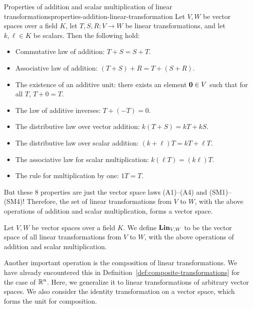 \begin{proposition}{Properties of addition and scalar multiplication of linear transformations}{properties-addition-linear-transformation}
  Let $V,W$ be vector spaces over a field $K$, let $T,S,R:V\to W$
  be linear transformations, and let $k,\ell\in K$ be scalars. Then
  the following hold:%
  \begin{itemize}\setlength\itemsep{0em}
  \item Commutative law of addition:
    $T+S = S+T$.
  \item Associative law of addition:
    $(T+S)+R = T+(S+R)$.
  \item The existence of an additive unit: there exists an element $\mbox{\bf 0}\in
    V$ such that for all $T$,
    $T + 0 = T$.
  \item The law of additive inverses:
    $T + (-T) = 0$.
  \item The distributive law over vector addition:
    $k(T + S) = kT + kS$.
  \item The distributive law over scalar addition:
    $(k + \ell) T = k T + \ell T$.
  \item The associative law for scalar multiplication:
    $k(\ell T) = (k \ell)T$.
  \item The rule for multiplication by one:
    $1T=T$.
  \end{itemize}
\end{proposition}

But these 8 properties are just the vector space laws (A1)--(A4) and
(SM1)--(SM4)! Therefore, the set of linear transformations from $V$ to
$W$, with the above operations of addition and scalar multiplication,
forms a vector space.

\begin{definition}
  Let $V,W$ be vector spaces over a field $K$. We define $\mathbf{Lin}_{V,W}$%
   to be the vector space of all linear
  transformations from $V$ to $W$, with the above operations of
  addition and scalar multiplication.
\end{definition}

Another important operation is the composition of linear
transformations. We have already encountered this in
Definition~\ref{def:composite-transformations} for the case of
$\mathbb{R}^n$. Here, we generalize it to linear transformations of arbitrary
vector spaces.  We also consider the identity transformation on a
vector space, which forms the unit for composition.

